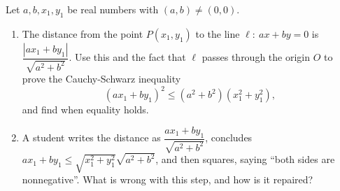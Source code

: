 Let $a,b,x_1,y_1$ be real numbers with $(a,b)\ne(0,0)$.
\begin{enumerate}
\item[(a)] The distance from the point $P(x_1,y_1)$ to the line $\ell:\ ax+by=0$ is $\dfrac{|ax_1+by_1|}{\sqrt{a^2+b^2}}$. Use this and the fact that $\ell$ passes through the origin $O$ to prove the Cauchy-Schwarz inequality
\[(ax_1+by_1)^2\le\left(a^2+b^2\right)\left(x_1^2+y_1^2\right),\]
and find when equality holds.
\item[(b)] A student writes the distance as $\dfrac{ax_1+by_1}{\sqrt{a^2+b^2}}$, concludes $ax_1+by_1\le\sqrt{x_1^2+y_1^2}\sqrt{a^2+b^2}$, and then squares, saying ``both sides are nonnegative''. What is wrong with this step, and how is it repaired?
\end{enumerate}
